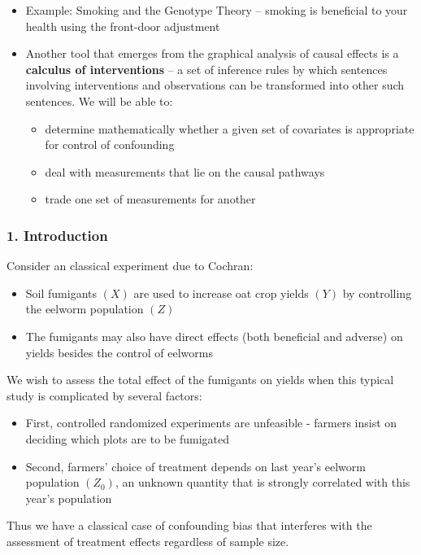 \documentclass{beamer}
\begin{document}
\begin{frame}
\begin{itemize}
\item Example: Smoking and the Genotype Theory -- smoking is beneficial to your health using the front-door adjustment
\item Another tool that emerges from the graphical analysis of causal effects is a \textbf{calculus of interventions} -- a set of inference rules by which sentences involving interventions and observations can be transformed into other such sentences. We will be able to:
\begin{itemize}
\item determine mathematically whether a given set of covariates is appropriate for control of confounding \item deal with measurements that lie on the causal pathways
\item trade one set of measurements for another
\end{itemize}
\end{itemize}
\end{frame}

\begin{frame}
\frametitle{1. Introduction}
Consider an classical experiment due to Cochran:
\begin{itemize}
\item Soil fumigants $(X)$ are used to increase oat crop yields $(Y)$ by controlling the eelworm population $(Z)$
\item The fumigants may also have direct effects (both beneficial and adverse) on yields besides the control of eelworms
\end{itemize}

We wish to assess the total effect of the fumigants on yields when this typical study is complicated by several factors:
\begin{itemize}
\item First, controlled randomized experiments are unfeasible - farmers insist on deciding which plots are to be fumigated
\item Second, farmers' choice of treatment depends on last year's eelworm population $\left(Z_0\right)$, an unknown quantity that is strongly correlated with this year's population
\end{itemize}

Thus we have a classical case of confounding bias that interferes with the assessment of treatment effects regardless of sample size.
\end{frame}
\end{document}
